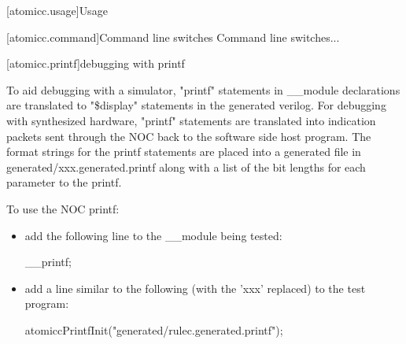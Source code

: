 [atomicc.usage]{Usage}

[atomicc.command]{Command line switches}
Command line switches...

[atomicc.printf]{debugging with printf}

To aid debugging with a simulator, "printf" statements in __module declarations are
translated to "\$display" statements in the generated verilog.
For debugging with synthesized hardware, "printf" statements are translated into
indication packets sent through the NOC back to the software side host program.
The format strings for the printf statements are placed into a generated file
in generated/xxx.generated.printf along with a list of the bit lengths for each
parameter to the printf.

To use the NOC printf:
\begin{itemize}
\item add the following line to the __module being tested:
\begin{codeblock}
     __printf;
\end{codeblock}
\item add a line similar to the following (with the 'xxx' replaced) to the test program:
\begin{codeblock}
     atomiccPrintfInit("generated/rulec.generated.printf");
\end{codeblock}
\end{itemize}

\begin{bnf}
\br
\end{bnf}
